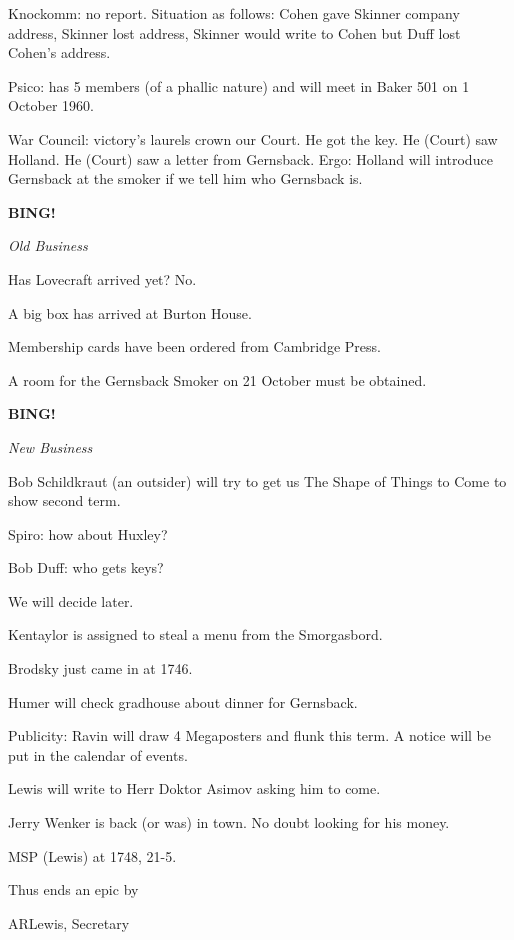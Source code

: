 \documentclass[12pt]{article}
\newcommand{\bing}{{\bf BING!} }
\newcommand{\goto}[1]{\bing \vskip 12pt \centerline{{\em{#1}}}}
\begin{document}
Knockomm: no report. Situation as follows: Cohen gave Skinner company address, Skinner lost address, Skinner would write to Cohen but Duff lost Cohen's address.

Psico: has 5 members (of a phallic nature) and will meet in Baker 501 on 1 October 1960.

War Council: victory's laurels crown our Court. He got the key. He (Court) saw Holland. He (Court) saw a letter from Gernsback. Ergo: Holland will introduce Gernsback at the smoker if we tell him who Gernsback is.

\goto{Old Business}

Has Lovecraft arrived yet? No.

A big box has arrived at Burton House.

Membership cards have been ordered from Cambridge Press.

A room for the Gernsback Smoker on 21 October must be obtained.

\goto{New Business}

Bob Schildkraut (an outsider) will try to get us The Shape of Things to Come to show second term.

Spiro: how about Huxley?

Bob Duff: who gets keys?

We will decide later.

Kentaylor is assigned to steal a menu from the Smorgasbord.

Brodsky just came in at 1746.

Humer will check gradhouse about dinner for Gernsback.

Publicity: Ravin will draw 4 Megaposters and flunk this term. A notice will be put in the calendar of events.

Lewis will write to Herr Doktor Asimov asking him to come.

Jerry Wenker is back (or was) in town. No doubt looking for his money.

MSP (Lewis) at 1748, 21-5.

\vspace{12pt}

\centerline{Thus ends an epic by}
\centerline{ARLewis, Secretary}
\end{document}
